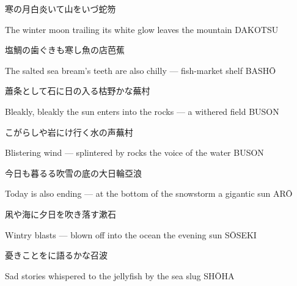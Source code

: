 \begin{haiku}
    {\FH 寒の月白炎いて山をいづ}\hfill{\FH 蛇笏}

    \vin{} The winter moon
    \vin{} \vin{} trailing its white glow
    \vin{} \vin{} \vin{} leaves the mountain \hspace{\fill} DAKOTSU
\end{haiku}

\begin{haiku}
    {\FH 塩鯛の歯ぐきも寒し魚の店}\hfill{\FH 芭蕉}

    \vin{} The salted sea bream's
    \vin{} \vin{} teeth are also chilly ---
    \vin{} \vin{} \vin{} fish-market shelf \hspace{\fill} BASH\={O}
\end{haiku}

\begin{haiku}
    {\FH 蕭条として石に日の入る枯野かな}\hfill{\FH 蕪村}

    \vin{} Bleakly, bleakly
    \vin{} \vin{} the sun enters into the rocks ---
    \vin{} \vin{} \vin{} a withered field \hspace{\fill} BUSON
\end{haiku}

\begin{haiku}
    {\FH こがらしや岩にけ行く水の声}\hfill{\FH 蕪村}

    \vin{} Blistering wind ---
    \vin{} \vin{} splintered by rocks
    \vin{} \vin{} \vin{} the voice of the water \hspace{\fill} BUSON
\end{haiku}

\begin{haiku}
    {\FH 今日も暮るる吹雪の底の大日輪}\hfill{\FH 亞浪}

    \vin{} Today is also ending ---
    \vin{} \vin{} at the bottom of the snowstorm
    \vin{} \vin{} \vin{} a gigantic sun \hspace{\fill} AR\={O}
\end{haiku}

\begin{haiku}
    {\FH 凩や海に夕日を吹き落す}\hfill{\FH 漱石}

    \vin{} Wintry blasts ---
    \vin{} \vin{} blown off into the ocean
    \vin{} \vin{} \vin{} the evening sun \hspace{\fill} S\={O}SEKI
\end{haiku}

\begin{haiku}
    {\FH 憂きことをに語るかな}\hfill{\FH 召波}

    \vin{} Sad stories
    \vin{} \vin{} whispered to the jellyfish
    \vin{} \vin{} \vin{} by the sea slug \hspace{\fill} SH\={O}HA
\end{haiku}

